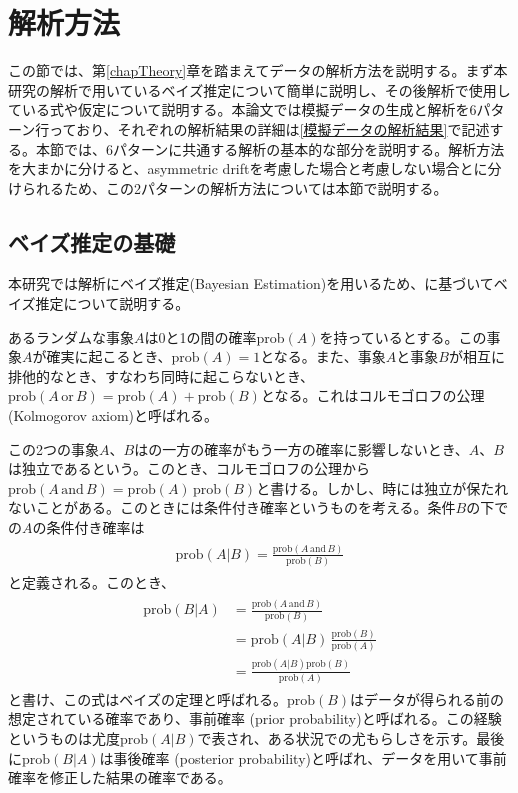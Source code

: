 
\section{解析方法}
この節では、第\ref{chapTheory}章を踏まえてデータの解析方法を説明する。まず本研究の解析で用いているベイズ推定について簡単に説明し、その後解析で使用している式や仮定について説明する。本論文では模擬データの生成と解析を6パターン行っており、それぞれの解析結果の詳細は\ref{模擬データの解析結果}で記述する。本節では、6パターンに共通する解析の基本的な部分を説明する。解析方法を大まかに分けると、asymmetric driftを考慮した場合と考慮しない場合とに分けられるため、この2パターンの解析方法については本節で説明する。

\subsection{ベイズ推定の基礎 \label{ベイズ推定の基礎}}
本研究では解析にベイズ推定(Bayesian Estimation)を用いるため、\cite{Statictics2012}に基づいてベイズ推定について説明する。

あるランダムな事象$A$は0と1の間の確率prob$(A)$を持っているとする。この事象$A$が確実に起こるとき、$\mathrm{prob}(A)=1$となる。また、事象$A$と事象$B$が相互に排他的なとき、すなわち同時に起こらないとき、$\mathrm{prob}(A\,\mathrm{or}\,B)=\mathrm{prob}(A) + \mathrm{prob}(B)$となる。これはコルモゴロフの公理 (Kolmogorov axiom)と呼ばれる。

この2つの事象$A、B$はの一方の確率がもう一方の確率に影響しないとき、$A、B$は独立であるという。このとき、コルモゴロフの公理から$\mathrm{prob}(A\,\mathrm{and}\,B)=\mathrm{prob}(A)\,\mathrm{prob}(B)$と書ける。しかし、時には独立が保たれないことがある。このときには条件付き確率というものを考える。条件$B$の下での$A$の条件付き確率は
\begin{align}
\begin{aligned}
	\mathrm{prob}(A|B) = \frac{\mathrm{prob}(A\,\mathrm{and}\,B)}{\mathrm{prob}(B)}
\end{aligned}
\end{align}
と定義される。このとき、
\begin{align}
\begin{aligned}
	\mathrm{prob}(B|A) &= \frac{\mathrm{prob}(A\,\mathrm{and}\,B)}{\mathrm{prob}(B)}\\
	&= \mathrm{prob}(A|B)\,\frac{\mathrm{prob}(B)}{\mathrm{prob}(A)}\\
	&= \frac{\mathrm{prob}(A|B)\mathrm{prob}(B)}{\mathrm{prob}(A)}
\end{aligned} \label{Bayesian}
\end{align}
と書け、この式はベイズの定理と呼ばれる。$\mathrm{prob}(B)$はデータが得られる前の想定されている確率であり、事前確率 (prior probability)と呼ばれる。この経験というものは尤度$\mathrm{prob}(A|B)$で表され、ある状況での尤もらしさを示す。最後に$\mathrm{prob}(B|A)$は事後確率 (posterior probability)と呼ばれ、データを用いて事前確率を修正した結果の確率である。

